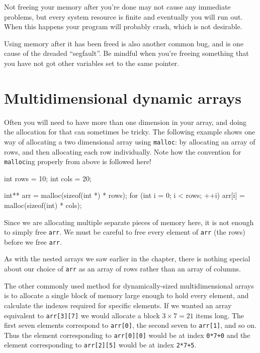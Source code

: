 Not freeing your memory after you're done may not cause any immediate problems, but every system resource is finite and eventually you will run out.
When this happens your program will probably crash, which is not desirable.

Using memory after it has been freed is also another common bug, and is one cause of the dreaded ``segfault''.
Be mindful when you're freeing something that you have not got other variables set to the same pointer.

\section{Multidimensional dynamic arrays}

Often you will need to have more than one dimension in your array, and doing the allocation for that can sometimes be tricky.
The following example shows one way of allocating a two dimensional array using \texttt{malloc}: by allocating an array of rows, and then allocating each row individually.
Note how the convention for \lstinline!malloc!ing properly from above is followed here! 

\begin{codeblock}
int rows = 10;
int cols = 20;

int** arr = malloc(sizeof(int *) * rows);
for (int i = 0; i < rows; ++i) {
    arr[i] = malloc(sizeof(int) * cols);
}
\end{codeblock}

Since we are allocating multiple separate pieces of memory here, it is not enough to simply free \lstinline!arr!.
We must be careful to free every element of \lstinline!arr! (the rows) before we free \lstinline!arr!.

As with the nested arrays we saw earlier in the chapter, there is nothing special about our choice of \lstinline!arr! as an array of rows rather than an array of columns.

The other commonly used method for dynamically-sized multidimensional arrays is to allocate a single block of memory large enough to hold every element, and calculate the indexes required for specific elements.
If we wanted an array equivalent to \lstinline!arr[3][7]! we would allocate a block $3 \times 7 = 21$ items long.
The first seven elements correspond to \lstinline!arr[0]!, the second seven to \lstinline!arr[1]!, and so on.
Thus the element corresponding to \lstinline!arr[0][0]! would be at index \lstinline!0*7+0! and the element corresponding to \lstinline!arr[2][5]! would be at index \lstinline!2*7+5!.

